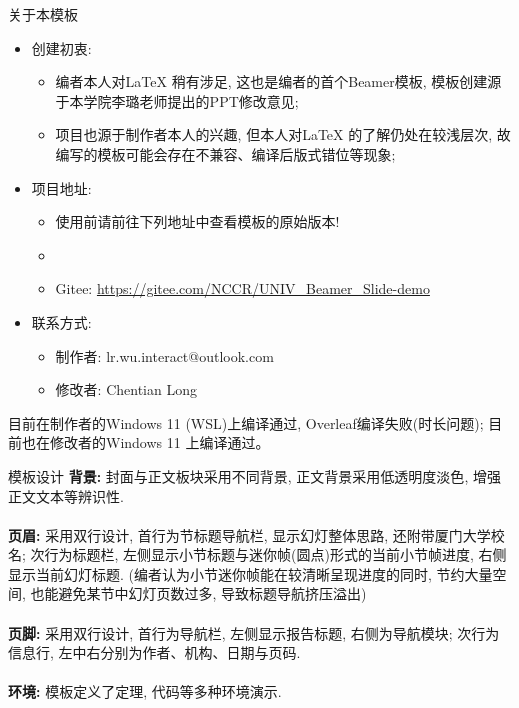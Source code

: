 \documentclass[hyperref, UTF8, CJK, aspectratio=169]{beamer}
\begin{document}
\begin{frame}{关于本模板}%
	\begin{itemize}
		\item 创建初衷:
		\begin{itemize}
			\item 编者本人对\LaTeX{} 稍有涉足, 这也是编者的首个Beamer模板, 模板创建源于本学院李璐老师提出的PPT修改意见;
			\item 项目也源于制作者本人的兴趣, 但本人对\LaTeX{} 的了解仍处在较浅层次, 故编写的模板可能会存在不兼容、编译后版式错位等现象;
		\end{itemize}
		\item 项目地址:
		\begin{itemize}
			\item 使用前请前往下列地址中查看模板的原始版本!
			\item \faGithub{}
			\item Gitee: \color{univblue}\url{https://gitee.com/NCCR/UNIV_Beamer_Slide-demo}
		\end{itemize}
		\item 联系方式:
		\begin{itemize}
			\item 制作者: lr.wu.interact@outlook.com
			\item 修改者: Chentian Long
		\end{itemize}
	\end{itemize}
	目前在制作者的Windows 11 (WSL)上编译通过, Overleaf编译失败(时长问题);
	目前也在修改者的Windows 11 上编译通过。
\end{frame}

\begin{frame}{模板设计}
	\textbf{背景:} 封面与正文板块采用{\color{univred}不同背景}, 正文背景采用{\color{univred}低透明度淡色}, 增强正文文本等辨识性.\\~\\
	\textbf{页眉:} 采用双行设计, 首行为{\color{univred}节标题导航栏}, 显示幻灯整体思路, 还附带厦门大学校名; 次行为标题栏, 左侧显示{\color{univred}小节标题}与{\color{univred}迷你帧(圆点)形式的当前小节帧进度}, 右侧显示当前{\color{univred}幻灯标题}. (编者认为小节迷你帧能在较清晰呈现进度的同时, 节约大量空间, 也能避免某节中幻灯页数过多, 导致标题导航挤压溢出)\\~\\
	\textbf{页脚:} 采用双行设计, 首行为导航栏, 左侧显示{\color{univred}报告标题}, 右侧为{\color{univred}导航模块}; 次行为信息行, 左中右分别为{\color{univred}作者}、{\color{univred}机构}、{\color{univred}日期与页码}.\\~\\
	\textbf{环境:} 模板定义了{\color{univred}定理}, {\color{univred}代码}等多种环境演示.
\end{frame}
\end{document}
